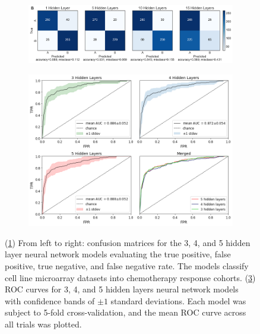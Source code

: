 \documentclass[10pt, letterpaper]{article}
\begin{document}
\begin{multicols*}{2}
\begin{figure}[!ht]
    \centering
    \begin{subfigure}[t]{\textwidth}
        \centering
        \includegraphics[width=\textwidth]{Figures/confusion_matrix/cm_combined.png}
        \caption{}
        \label{fig:cms}
    \end{subfigure}

    \begin{subfigure}[t]{\textwidth}
        \centering
        \includegraphics[width=\textwidth]{Figures/roc/full_merged.png}
        \caption{}
        \label{fig:roc}
    \end{subfigure}

    \caption{(\ref{fig:cms}) From left to right: confusion matrices for the 3, 4, and 5 hidden layer neural network models evaluating the true positive, false positive, true negative, and false negative rate. The models classify cell line microarray datasets into chemotherapy response cohorts. (\ref{fig:roc}) ROC curves for 3, 4, and 5 hidden layers neural network models with confidence bands of $\pm 1$ standard deviations. Each model was subject to 5-fold cross-validation, and the mean ROC curve across all trials was plotted.}
\end{figure}



\end{multicols*}
\end{document}
